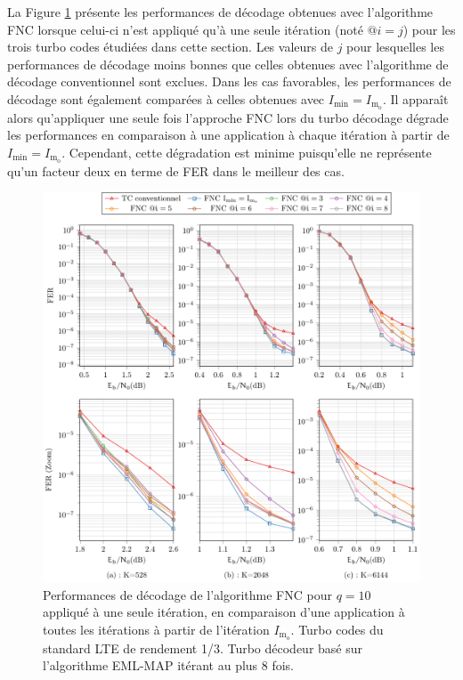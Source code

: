 La Figure 
\ref{fig:fnc_onlyX} présente les performances de décodage obtenues avec l'algorithme FNC lorsque celui-ci n'est appliqué
qu'à une seule itération (noté $@i=j$) pour les trois turbo codes étudiées dans cette section. Les valeurs de $j$ pour lesquelles les performances de décodage moins bonnes que celles 
obtenues avec l'algorithme de décodage conventionnel sont exclues. Dans les cas favorables, les performances de décodage 
sont également comparées à celles obtenues avec $I_\text{min} = I_{\text{m}_\text{o}}$. Il apparaît alors qu'appliquer une 
seule fois l'approche FNC lors du turbo décodage dégrade les performances en comparaison à une application à chaque itération à partir de $I_\text{min}
 = I_{\text{m}_\text{o}}$. Cependant, cette dégradation est minime puisqu'elle ne représente qu'un facteur deux en terme de FER dans le 
 meilleur des cas.

\begin{figure}[!ht]
	\centering
	\hspace*{-.1\textwidth}
	\includegraphics[width=1.12\textwidth]{main/ch4_fig/final/tikz_last/fnc10_onlyX.pdf}
	\caption{Performances de décodage de l'algorithme FNC pour $q=10$ appliqué à une seule itération, en comparaison
	d'une application à toutes les itérations à partir de l'itération  $I_{\text{m}_\text{o}}$.
	Turbo codes du standard LTE de rendement 1/3. 
	Turbo décodeur basé sur l'algorithme EML-MAP itérant au plus 8 fois.
	\label{fig:fnc_onlyX}}
	\vspace*{-1ex}
\end{figure}

